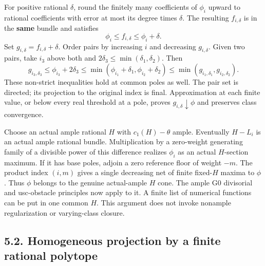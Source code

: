 \documentclass[
  10pt,
]{article}
\begin{document}
For positive rational \(\delta\), round the finitely many coefficients
of \(\phi_i\) upward to rational coefficients with error at most its
degree times \(\delta\). The resulting \(f_{i,\delta}\) is in the
\textbf{same} bundle and satisfies
\[\phi_i\leq f_{i,\delta}\leq\phi_i+\delta.\] Set
\(g_{i,\delta}=f_{i,\delta}+\delta\). Order pairs by increasing \(i\)
and decreasing \(g_{i,\delta}\). Given two pairs, take \(i_3\) above
both and \(2\delta_3\leq\min(\delta_1,\delta_2)\). Then
\[g_{i_3,\delta_3}\leq\phi_{i_3}+2\delta_3\leq
\min(\phi_{i_1}+\delta_1,\phi_{i_2}+\delta_2)\leq
\min(g_{i_1,\delta_1},g_{i_2,\delta_2}).\] These non-strict inequalities
hold at common poles as well. The pair set is directed; its projection
to the original index is final. Approximation at each finite value, or
below every real threshold at a pole, proves
\(g_{i,\delta}\downarrow\phi\) and preserves class convergence.

Choose an actual ample rational \(H\) with \(c_1(H)-\theta\) ample.
Eventually \(H-L_i\) is an actual ample rational bundle. Multiplication
by a zero-weight generating family of a divisible power of this
difference realizes \(\phi_i\) as an actual \(H\)-section maximum. If it
has base poles, adjoin a zero reference floor of weight \(-m\). The
product index \((i,m)\) gives a single decreasing net of finite
fixed-\(H\) maxima to \(\phi\). Thus \(\phi\) belongs to the genuine
actual-ample \(H\) cone. The ample G0 divisorial and usc-obstacle
principles now apply to it. A finite list of numerical functions can be
put in one common \(H\). This argument does not invoke nonample
regularization or varying-class closure.

\subsection{5.2. Homogeneous projection by a finite rational
polytope}\label{homogeneous-projection-by-a-finite-rational-polytope}
\end{document}
